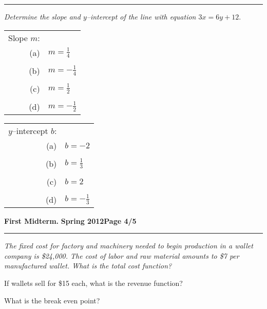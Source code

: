 \documentclass[12pt]{article}
\begin{document}
\vspace{7cm}
\hrule
{\problem[15 pts] \em Determine the slope and $y$--intercept of the
  line with equation $3x=6y+12.$}
\begin{tabular}{rl}
Slope $m$: \\
(a) & $m=\tfrac{1}{4}$ \\ \\
(b) & $m=-\tfrac{1}{4}$ \\ \\
(c) &$m=\tfrac{1}{2}$ \\ \\
(d) &$m=-\tfrac{1}{2}$
\end{tabular} \hspace{3cm}
\begin{tabular}{rl}
$y$--intercept $b$: \\
(a) & $b=-2$ \\ \\
(b) &$b=\tfrac{1}{3}$ \\ \\
(c) &$b=2$ \\ \\
(d) &$b=-\tfrac{1}{3}$
\end{tabular}
\newpage

\hfill{\large\bf First Midterm.}\hfill{\large\bf
  Spring 2012}\hfill{\large\bf Page 4/5}\hrule

\bigskip
{\problem[15 pts] \em The fixed cost for factory and machinery needed
  to begin production in a wallet company is \$24,000.  The cost of
  labor and raw material amounts to \$7 per manufactured wallet.
  What is the total cost function?}
\vspace{1cm}

\begin{flushright}
\end{flushright}
\noindent
If wallets sell for \$15 each, what is the revenue function?
\vspace{1cm}

\begin{flushright}
\end{flushright}
\noindent
What is the break even point?
\vspace{3cm}
\end{document}
